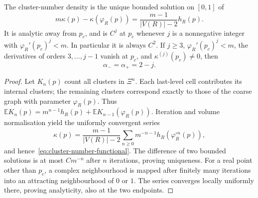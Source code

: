 \begin{proposition}\label{prop:cluster-number-response}
The cluster-number density is the unique bounded solution on $[0,1]$ of
\begin{equation}\label{eq:cluster-number-functional}
 m\kappa(p)-\kappa(\varphi_R(p))
 =\frac{m-1}{|V(R)|-2}h_R(p).
\end{equation}
It is analytic away from $p_c$, and is $C^j$ at $p_c$ whenever $j$ is a nonnegative integer with $\varphi_R'(p_c)^j<m$.
In particular it is always $C^2$.
If $j\ge3$, $\varphi_R'(p_c)^j<m$, the derivatives of orders $3,\ldots,j-1$ vanish at $p_c$, and $\kappa^{(j)}(p_c)\ne0$, then
\[
 \alpha_- =\alpha_+=2-j.
\]
\end{proposition}
\begin{proof}
Let $K_n(p)$ count all clusters in $\Xi^n$.
Each last-level cell contributes its internal clusters; the remaining clusters correspond exactly to those of the coarse graph with parameter $\varphi_R(p)$.
Thus $\mathbb E K_n(p)=m^{n-1}h_R(p)+\mathbb E K_{n-1}(\varphi_R(p))$.
Iteration and volume normalisation yield the uniformly convergent series
\begin{equation}\label{eq:cluster-number-series}
 \kappa(p)=\frac{m-1}{|V(R)|-2}
 \sum_{n\ge0}m^{-n-1}h_R(\varphi_R^{\circ n}(p)),
\end{equation}
and hence~\eqref{eq:cluster-number-functional}.
The difference of two bounded solutions is at most $Cm^{-n}$ after $n$ iterations, proving uniqueness.
For a real point other than $p_c$, a complex neighbourhood is mapped after finitely many iterations into an attracting neighbourhood of $0$ or $1$.
The series converges locally uniformly there, proving analyticity, also at the two endpoints.


\end{proof}
